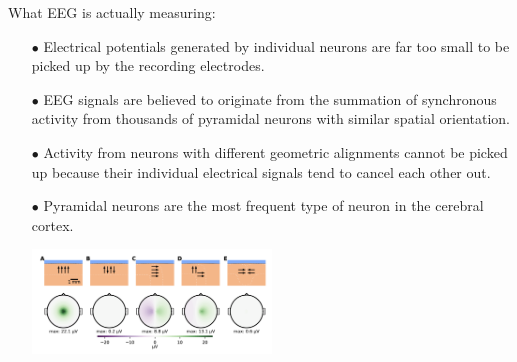 \documentclass[aspectratio=169, 9pt]{beamer}
\begin{document}
\begin{frame}{What EEG is actually measuring:}
    \begin{itemize}
      \item[$\bullet$] Electrical potentials generated by individual neurons are far too small to be picked up by the recording electrodes.

      \item[$\bullet$] EEG signals are believed to originate from the summation of synchronous activity from thousands of pyramidal neurons with similar spatial orientation.

      \item[$\bullet$] Activity from neurons with different geometric alignments cannot be picked up because their individual electrical signals tend to cancel each other out.

      \item[$\bullet$] Pyramidal neurons are the most frequent type of neuron in the cerebral cortex.

      \includegraphics[width=0.5\textwidth]{figures/Dipole_orientation.png}

    \end{itemize}
\end{frame}


%
\end{document}
